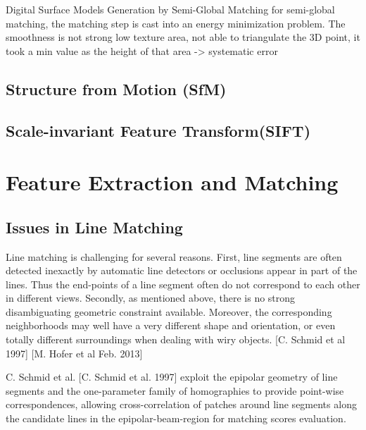 Digital Surface Models Generation by Semi-Global Matching
for semi-global matching, the matching step is cast into an energy minimization problem.
The smoothness is not strong
low texture area, not able to triangulate the 3D point, it took a min value as the height of that area -> systematic error



\subsection{Structure from Motion (SfM)}


\subsection{Scale-invariant Feature Transform(SIFT)}


\section{Feature Extraction and Matching}


\subsection{Issues in Line Matching}

Line matching is challenging for several reasons. First, line segments are often detected inexactly by automatic line detectors or occlusions appear in part of the lines. Thus the end-points of a line segment often do not correspond to each other in different views. Secondly, as mentioned above, there is no strong disambiguating geometric constraint available. Moreover, the corresponding neighborhoods may well have a very different shape and orientation, or even totally different surroundings when dealing with wiry objects. [C. Schmid et al 1997] [M. Hofer et al Feb. 2013]

C. Schmid et al. [C. Schmid et al. 1997] exploit the epipolar geometry of line segments and the one-parameter family of homographies to provide point-wise correspondences, allowing cross-correlation of patches around line segments along the candidate lines in the epipolar-beam-region for matching scores evaluation.


